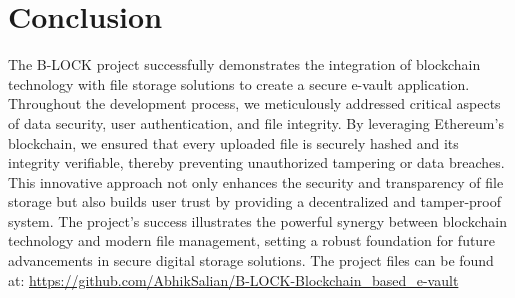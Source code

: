 \documentclass[12pt,a4paper]{report}
\begin{document}
\section{Conclusion}
The B-LOCK project successfully demonstrates the integration of blockchain technology with file storage solutions to create a secure e-vault application. Throughout the development process, we meticulously addressed critical aspects of data security, user authentication, and file integrity. By leveraging Ethereum’s blockchain, we ensured that every uploaded file is securely hashed and its integrity verifiable, thereby preventing unauthorized tampering or data breaches. This innovative approach not only enhances the security and transparency of file storage but also builds user trust by providing a decentralized and tamper-proof system. The project's success illustrates the powerful synergy between blockchain technology and modern file management, setting a robust foundation for future advancements in secure digital storage solutions.
The project files can be found at: \url{https://github.com/AbhikSalian/B-LOCK-Blockchain_based_e-vault}

\end{document}
